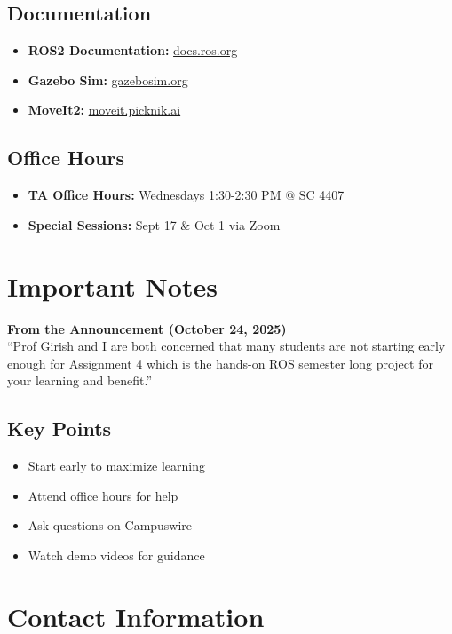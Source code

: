 \documentclass[11pt,a4paper]{article}
\begin{document}
\subsection{Documentation}
\begin{itemize}
    \item \textbf{ROS2 Documentation:} \href{https://docs.ros.org/en/jazzy/}{docs.ros.org}
    \item \textbf{Gazebo Sim:} \href{https://gazebosim.org/docs}{gazebosim.org}
    \item \textbf{MoveIt2:} \href{https://moveit.picknik.ai/}{moveit.picknik.ai}
\end{itemize}

\subsection{Office Hours}
\begin{itemize}
    \item \textbf{TA Office Hours:} Wednesdays 1:30-2:30 PM @ SC 4407
    \item \textbf{Special Sessions:} Sept 17 \& Oct 1 via Zoom
\end{itemize}

\section{Important Notes}

\begin{warningbox}
\textbf{From the Announcement (October 24, 2025)}\\[0.3cm]
``Prof Girish and I are both concerned that many students are not starting early enough for Assignment 4 which is the hands-on ROS semester long project for your learning and benefit.''
\end{warningbox}

\subsection{Key Points}
\begin{itemize}
    \item Start early to maximize learning
    \item Attend office hours for help
    \item Ask questions on Campuswire
    \item Watch demo videos for guidance
\end{itemize}

\section{Contact Information}
\end{document}
